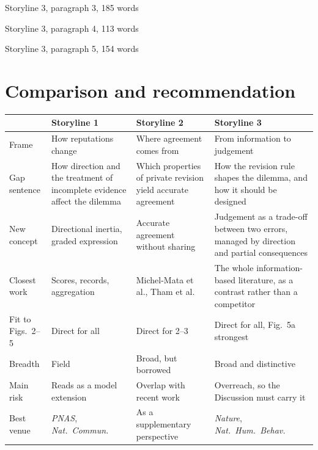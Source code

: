 \documentclass[11pt]{article}
\begin{document}
\begin{draft}{Storyline 3, paragraph 3, 185 words}

\end{draft}
\begin{draft}{Storyline 3, paragraph 4, 113 words}

\end{draft}
\begin{draft}{Storyline 3, paragraph 5, 154 words}

\end{draft}

\section{Comparison and recommendation}

\begin{center}\small
\begin{tabularx}{\linewidth}{@{}>{\raggedright\arraybackslash}p{2.3cm} L L L@{}}
\toprule
& \textbf{Storyline 1} & \textbf{Storyline 2} & \textbf{Storyline 3} \\
\midrule
Frame & How reputations change & Where agreement comes from & From information to judgement \\
Gap sentence & How direction and the treatment of incomplete evidence affect the dilemma & Which properties of private revision yield accurate agreement & How the revision rule shapes the dilemma, and how it should be designed \\
New concept & Directional inertia, graded expression & Accurate agreement without sharing & Judgement as a trade-off between two errors, managed by direction and partial consequences \\
Closest work & Scores, records, aggregation & Michel-Mata et al.\cite{michelmata2024}, Tham et al.\cite{tham2026} & The whole information-based literature, as a contrast rather than a competitor \\
Fit to Figs.\ 2--5 & Direct for all & Direct for 2--3 & Direct for all, Fig.~5a strongest \\
Breadth & Field & Broad, but borrowed & Broad and distinctive \\
Main risk & Reads as a model extension & Overlap with recent work & Overreach, so the Discussion must carry it \\
Best venue & \textit{PNAS}, \textit{Nat.\ Commun.} & As a supplementary perspective & \textit{Nature}, \textit{Nat.\ Hum.\ Behav.} \\
\bottomrule
\end{tabularx}
\end{center}
\end{document}

